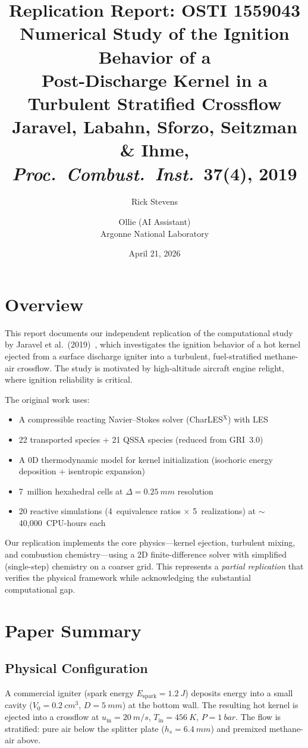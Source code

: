 \documentclass[11pt]{article}
\title{\textbf{Replication Report: OSTI 1559043}\\[0.3em]
\large Numerical Study of the Ignition Behavior of a\\
Post-Discharge Kernel in a Turbulent Stratified Crossflow\\[0.3em]
\normalsize Jaravel, Labahn, Sforzo, Seitzman \& Ihme,\\
\textit{Proc.\ Combust.\ Inst.}\ \textbf{37}(4), 2019}
\author{Rick Stevens \and Ollie (AI Assistant)\\
Argonne National Laboratory}
\date{April 21, 2026}
\begin{document}
\maketitle
\thispagestyle{fancy}

\section{Overview}

This report documents our independent replication of the computational study by Jaravel et al.\ (2019)~\cite{jaravel2019}, which investigates the ignition behavior of a hot kernel ejected from a surface discharge igniter into a turbulent, fuel-stratified methane-air crossflow. The study is motivated by high-altitude aircraft engine relight, where ignition reliability is critical.

The original work uses:
\begin{itemize}[leftmargin=*]
    \item A compressible reacting Navier--Stokes solver (CharLES$^{\mathrm{X}}$) with LES
    \item 22 transported species + 21 QSSA species (reduced from GRI~3.0)
    \item A 0D thermodynamic model for kernel initialization (isochoric energy deposition + isentropic expansion)
    \item 7~million hexahedral cells at $\Delta = \SI{0.25}{mm}$ resolution
    \item 20 reactive simulations (4~equivalence ratios $\times$ 5~realizations) at $\sim$40,000~CPU-hours each
\end{itemize}

Our replication implements the core physics---kernel ejection, turbulent mixing, and combustion chemistry---using a 2D finite-difference solver with simplified (single-step) chemistry on a coarser grid. This represents a \emph{partial replication} that verifies the physical framework while acknowledging the substantial computational gap.

\section{Paper Summary}

\subsection{Physical Configuration}
A commercial igniter (spark energy $E_\mathrm{spark} = \SI{1.2}{J}$) deposits energy into a small cavity ($V_0 = \SI{0.2}{cm^3}$, $D = \SI{5}{mm}$) at the bottom wall. The resulting hot kernel is ejected into a crossflow at $u_\mathrm{in} = \SI{20}{m/s}$, $T_\mathrm{in} = \SI{456}{K}$, $P = \SI{1}{bar}$. The flow is stratified: pure air below the splitter plate ($h_s = \SI{6.4}{mm}$) and premixed methane-air above.
\end{document}
